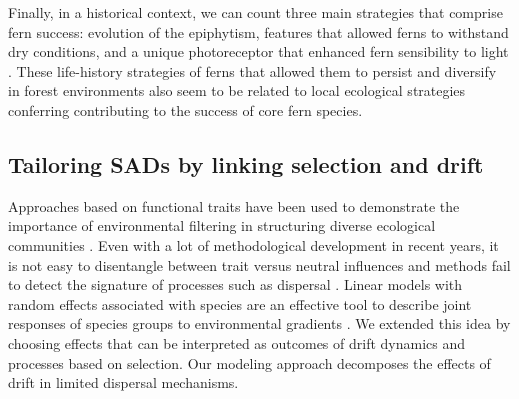 \documentclass[12pt]{article}
\begin{document}
Finally, in a historical context, we can count three main strategies that comprise fern success: evolution of the epiphytism, features that allowed ferns to withstand dry conditions, and a unique photoreceptor that enhanced fern sensibility to light \citep{Schneider2004, Schuettpelz2009}. These life-history strategies of ferns that allowed them to persist and diversify in forest environments also seem to be related to local ecological
strategies conferring contributing to the success of core fern species. 


\subsection*{Tailoring SADs by linking selection and drift}

Approaches based on functional traits have been used to demonstrate the importance of environmental  filtering  in  structuring  diverse  ecological communities \citep{lavorel2002predicting, Baraloto2012}. Even with a lot of methodological development in recent years, it is not easy to disentangle between trait versus neutral influences and methods fail to detect the signature of processes such as dispersal \citep{kembel2009disentangling}. 
Linear models with random effects associated with species are an effective tool to describe joint responses of species groups to environmental gradients \citep{Jackson2012, Brown2014}. We extended this idea by choosing effects that can be interpreted as outcomes of drift dynamics and processes based on selection. Our modeling approach  decomposes the effects of drift in limited dispersal mechanisms.
\end{document}
